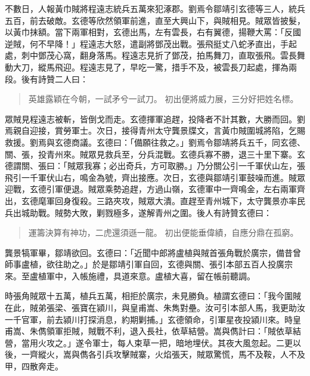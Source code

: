 不數日，人報黃巾賊將程遠志統兵五萬來犯涿郡。劉焉令鄒靖引玄德等三人，統兵五百，前去破敵。玄德等欣然領軍前進，直至大興山下，與賊相見。賊眾皆披髮，以黃巾抹額。當下兩軍相對，玄德出馬，左有雲長，右有翼德，揚鞭大罵：「反國逆賊，何不早降！」程遠志大怒，遣副將鄧茂出戰。張飛挺丈八蛇矛直出，手起處，刺中鄧茂心窩，翻身落馬。程遠志見折了鄧茂，拍馬舞刀，直取張飛。雲長舞動大刀，縱馬飛迎。程遠志見了，早吃一驚，措手不及，被雲長刀起處，揮為兩段。後有詩贊二人曰：

\begin{quote}
英雄露穎在今朝，一試矛兮一試刀。
初出便將威力展，三分好把姓名標。
\end{quote}

眾賊見程遠志被斬，皆倒戈而走。玄德揮軍追趕，投降者不計其數，大勝而回。劉焉親自迎接，賞勞軍士。次日，接得青州太守龔景牒文，言黃巾賊圍城將陷，乞賜救援。劉焉與玄德商議。玄德曰：「備願往救之。」劉焉令鄒靖將兵五千，同玄德、關、張，投青州來。賊眾見救兵至，分兵混戰。玄德兵寡不勝，退三十里下寨。玄德謂關、張曰：「賊眾我寡；必出奇兵，方可取勝。」乃分關公引一千軍伏山左，張飛引一千軍伏山右，鳴金為號，齊出接應。次日，玄德與鄒靖引軍鼓噪而進。賊眾迎戰，玄德引軍便退。賊眾乘勢追趕，方過山嶺，玄德軍中一齊鳴金，左右兩軍齊出，玄德麾軍回身復殺。三路夾攻，賊眾大潰。直趕至青州城下，太守龔景亦率民兵出城助戰。賊勢大敗，剿戮極多，遂解青州之圍。後人有詩贊玄德曰：

\begin{quote}
運籌決算有神功，二虎還須遜一龍。
初出便能垂偉績，自應分鼎在孤窮。
\end{quote}

龔景犒軍畢，鄒靖欲回。玄德曰：「近聞中郎將盧植與賊首張角戰於廣宗，備昔曾師事盧植，欲往助之。」於是鄒靖引軍自回，玄德與關、張引本部五百人投廣宗來。至盧植軍中，入帳施禮，具道來意。盧植大喜，留在帳前聽調。

時張角賊眾十五萬，植兵五萬，相拒於廣宗，未見勝負。植謂玄德曰：「我今圍賊在此，賊弟張梁、張寶在潁川，與皇甫嵩、朱雋對壘。汝可引本部人馬，我更助汝一千官軍，前去潁川打探消息，約期剿捕。」玄德領命，引軍星夜投潁川來。時皇甫嵩、朱儁領軍拒賊，賊戰不利，退入長社，依草結營。嵩與儁計曰：「賊依草結營，當用火攻之。」遂令軍士，每人束草一把，暗地埋伏。其夜大風忽起。二更以後，一齊縱火，嵩與儁各引兵攻擊賊寨，火焰張天，賊眾驚慌，馬不及鞍，人不及甲，四散奔走。

